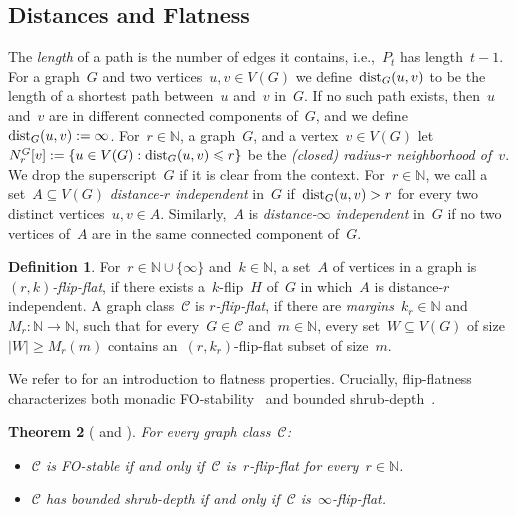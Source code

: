 \documentclass[11pt]{article}      \usepackage[margin=1in]{geometry}  \usepackage{microtype}
\newtheorem{theorem}{Theorem}[section]
\theoremstyle{definition}
\newtheorem{definition}[theorem]{Definition}
\newcommand{\N}[0]{\mathrm{\mathbb{N}}}
\newcommand{\dist}{\textnormal{dist}}
\newcommand{\CC}{\mathcal{C}}
\renewcommand{\le}{\leqslant}
\renewcommand{\leq}{\le}
\renewcommand{\ge}{\geqslant}
\renewcommand{\geq}{\ge}
\begin{document}
\subsection{Distances and Flatness}
The \emph{length} of a path is the number of edges it contains, i.e.,~$P_t$ has length~$t-1$.
For a graph~$G$ and two vertices~$u,v \in V(G)$ we define~$\dist_G(u,v)$ to be the length of a shortest path between~$u$ and~$v$ in~$G$.
If no such path exists, then~$u$ and~$v$ are in different connected components of~$G$, and we define~$\dist_G(u,v) := \infty$.
For~$r\in\N$, a graph~$G$, and a vertex~$v \in V(G)$ let~$N_r^G[v] := \{u \in V(G) : \dist_G(u,v) \leq r\}$ be the \emph{(closed) radius-$r$ neighborhood of~$v$}.
We drop the superscript~$G$ if it is clear from the context.
For~$r\in\N$, we call a set~$A \subseteq V(G)$ \emph{distance-$r$ independent}  in~$G$ if~$\dist_G(u,v) > r$ for every two distinct vertices~$u,v \in A$.
Similarly,~$A$ is \emph{distance-$\infty$ independent} in~$G$ if no two vertices of~$A$ are in the same connected component of~$G$.
\begin{definition}
    For~$r\in \N \cup \{\infty\}$ and~$k\in\N$, a set~$A$ of vertices in a graph is \emph{$(r,k)$-flip-flat}, if there exists a~$k$-flip~$H$ of~$G$ in which~$A$ is distance-$r$ independent.
    A graph class~$\CC$ is 
    \emph{$r$-flip-flat},
        if there are \emph{margins}~$k_r\in\N$ and~$M_r:\N\to\N$, such that for every~$G\in\CC$ and~$m\in\N$, every set~$W \subseteq V(G)$ of size~$|W|\geq M_r(m)$ contains an~$(r,k_r)$-flip-flat subset of size~$m$.
\end{definition}

We refer to \cite{maehlmann-thesis} for an introduction to flatness properties.
Crucially, flip-flatness characterizes both monadic FO-stability~\cite{dreier2022indiscernibles} and bounded shrub-depth~\cite{dreier2024flipbreakability}.

\begin{theorem}[{\cite{dreier2022indiscernibles} and \cite{dreier2024flipbreakability}}]\label{thm:flip-flat}
    For every graph class~$\CC$:
    \begin{itemize}
        \item $\CC$ is FO-stable if and only if~$\CC$ is~$r$-flip-flat for every~$r\in\N$.
        \item $\CC$ has bounded shrub-depth if and only if~$\CC$ is~$\infty$-flip-flat.
    \end{itemize}
\end{theorem}
\end{document}
